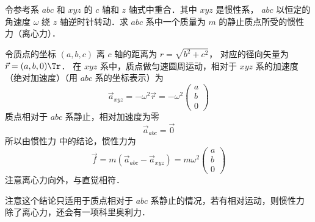 
令参考系 $abc$ 和 $xyz$ 的 $c$ 轴和 $z$ 轴式中重合．其中 $xyz$ 是惯性系， $abc$ 以恒定的角速度 $\omega$ 绕 $z$ 轴逆时针转动．求 $abc$ 系中一个质量为 $m$ 的静止质点所受的惯性力（离心力）．

令质点的坐标 $(a,b,c)$ 离 $c$ 轴的距离为 $r = \sqrt {{b^2} + {c^2}}$， 对应的径向矢量为 $\vec r = (a,b,0)\Tr$． 在 $xyz$ 系中，质点做匀速圆周运动，相对于 $xyz$ 系的加速度（绝对加速度）（用 $abc$ 系的坐标表示）为
\begin{equation}
{\vec a_{xyz}} =  - {\omega ^2}\vec r =  - {\omega ^2}\begin{pmatrix} a\\b\\0 \end{pmatrix}
\end{equation}
质点相对于 $abc$ 系静止，相对加速度为零
\begin{equation}
{\vec a_{abc}} = \vec 0
\end{equation}
所以由惯性力 中的结论，惯性力为
\begin{equation}
\vec f = m\left( {{{\vec a}_{abc}} - {{\vec a}_{xyz}}} \right) = m{\omega ^2}\begin{pmatrix} a\\b\\0 \end{pmatrix}
\end{equation}
注意离心力向外，与直觉相符．

注意这个结论只适用于质点相对于 $abc$ 系静止的情况，若有相对运动，则惯性力除了离心力，还会有一项科里奥利力．
